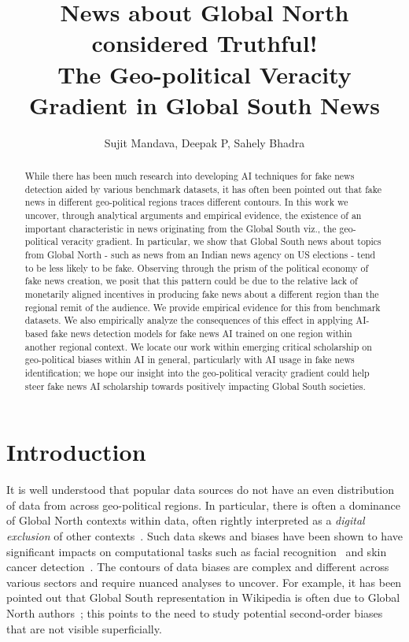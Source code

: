 \documentclass[runningheads]{llncs}
\begin{document}
\title{News about Global North considered Truthful! \\ The Geo-political Veracity Gradient in Global South News}
\author{Sujit Mandava, Deepak P, Sahely Bhadra}
\date{}
\institute{}

\maketitle

\begin{abstract}
While there has been much research into developing AI techniques for fake news detection aided by various benchmark datasets, it has often been pointed out that fake news in different geo-political regions traces different contours. In this work we uncover, through analytical arguments and empirical evidence, the existence of an important characteristic in news originating from the Global South viz., the geo-political veracity gradient. In particular, we show that Global South news about topics from Global North - such as news from an Indian news agency on US elections - tend to be less likely to be fake. Observing through the prism of the political economy of fake news creation, we posit that this pattern could be due to the relative lack of monetarily aligned incentives in producing fake news about a different region than the regional remit of the audience. We provide empirical evidence for this from benchmark datasets. We also empirically analyze the consequences of this effect in applying AI-based fake news detection models for fake news AI trained on one region within another regional context. We locate our work within emerging critical scholarship on geo-political biases within AI in general, particularly with AI usage in fake news identification; we hope our insight into the geo-political veracity gradient could help steer fake news AI scholarship towards positively impacting Global South societies. 
\end{abstract}

\section{Introduction}

It is well understood that popular data sources do not have an even distribution of data from across geo-political regions. In particular, there is often a dominance of Global North contexts within data, often rightly interpreted as a {\it digital exclusion} of other contexts~\cite{graham2022data}. Such data skews and biases have been shown to have significant impacts on computational tasks such as facial recognition~\cite{jaiswal2024breaking} and skin cancer detection~\cite{pope2024skin}. The contours of data biases are complex and different across various sectors and require nuanced analyses to uncover. For example, it has been pointed out that Global South representation in Wikipedia is often due to Global North authors~\cite{graham2022data}; this points to the need to study potential second-order biases that are not visible superficially. 
\end{document}
